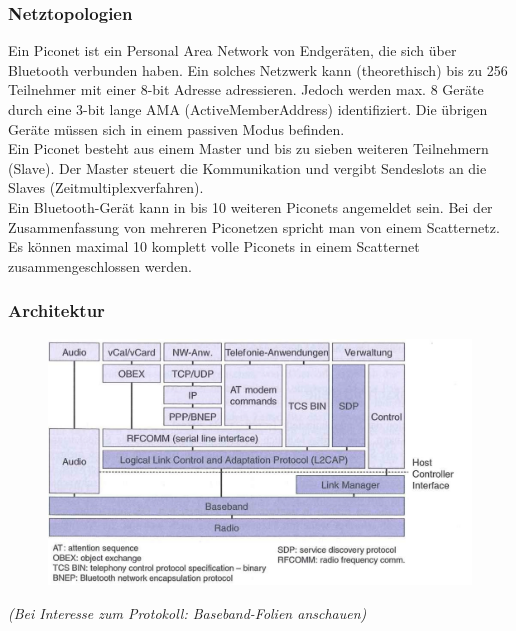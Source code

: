 \documentclass{article} %
\begin{document}
\subsubsection{Netztopologien}
Ein Piconet ist ein Personal Area Network von Endgeräten, die sich über Bluetooth verbunden haben. Ein solches Netzwerk kann (theorethisch) bis zu 256 Teilnehmer mit einer 8-bit Adresse adressieren. Jedoch werden max. 8 Geräte durch eine 3-bit lange AMA (ActiveMemberAddress) identifiziert. Die übrigen Geräte müssen sich in einem passiven Modus befinden.\\
Ein Piconet besteht aus einem Master und bis zu sieben weiteren  Teilnehmern (Slave). Der Master steuert die Kommunikation und vergibt Sendeslots an die Slaves (Zeitmultiplexverfahren). \\
Ein Bluetooth-Gerät kann in bis 10 weiteren Piconets angemeldet sein. Bei der Zusammenfassung von mehreren Piconetzen spricht man von einem Scatternetz. Es können maximal 10 komplett volle Piconets in einem Scatternet zusammengeschlossen werden. 

\subsubsection{Architektur}
	\begin{figure}[h]
	\centering
	\includegraphics[width=14cm]{img/arch.png}
	\end{figure}	
\textit{(Bei Interesse zum Protokoll: Baseband-Folien anschauen)}
\end{document}
